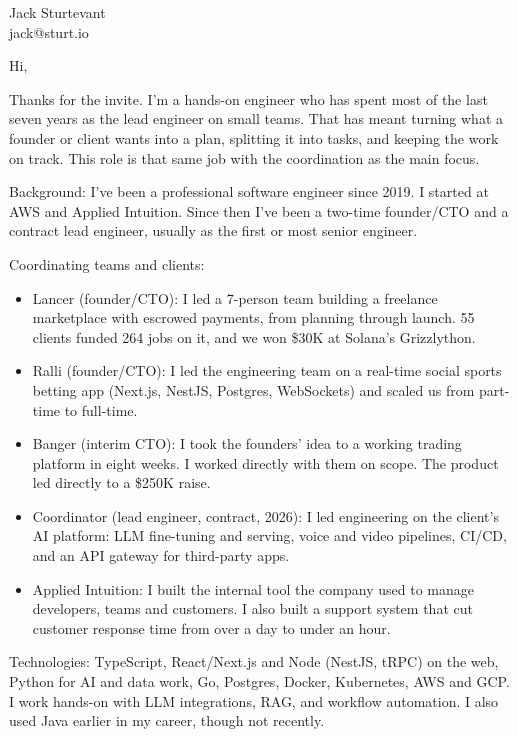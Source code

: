 \documentclass[11pt]{article}
\begin{document}
\raggedright

{\namefont\fontsize{20pt}{24pt}\selectfont Jack Sturtevant}\\[-0.3em]
jack@sturt.io

\vspace{1em}

Hi,

Thanks for the invite. I'm a hands-on engineer who has spent most of the last seven years as the lead engineer on small teams. That has meant turning what a founder or client wants into a plan, splitting it into tasks, and keeping the work on track. This role is that same job with the coordination as the main focus.

Background: I've been a professional software engineer since 2019. I started at AWS and Applied Intuition. Since then I've been a two-time founder/CTO and a contract lead engineer, usually as the first or most senior engineer.

Coordinating teams and clients:
\begin{itemize}
\item Lancer (founder/CTO): I led a 7-person team building a freelance marketplace with escrowed payments, from planning through launch. 55 clients funded 264 jobs on it, and we won \$30K at Solana's Grizzlython.
\item Ralli (founder/CTO): I led the engineering team on a real-time social sports betting app (Next.js, NestJS, Postgres, WebSockets) and scaled us from part-time to full-time.
\item Banger (interim CTO): I took the founders' idea to a working trading platform in eight weeks. I worked directly with them on scope. The product led directly to a \$250K raise.
\item Coordinator (lead engineer, contract, 2026): I led engineering on the client's AI platform: LLM fine-tuning and serving, voice and video pipelines, CI/CD, and an API gateway for third-party apps.
\item Applied Intuition: I built the internal tool the company used to manage developers, teams and customers. I also built a support system that cut customer response time from over a day to under an hour.
\end{itemize}

Technologies: TypeScript, React/Next.js and Node (NestJS, tRPC) on the web, Python for AI and data work, Go, Postgres, Docker, Kubernetes, AWS and GCP. I work hands-on with LLM integrations, RAG, and workflow automation. I also used Java earlier in my career, though not recently.
\end{document}
